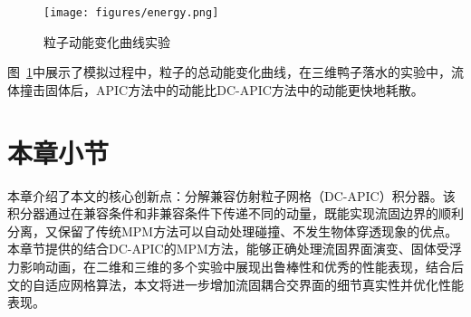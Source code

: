 \begin{figure}[H]
    \centering
    \texttt{[image: figures/energy.png]}
    \caption{粒子动能变化曲线实验}
    \label{fig:energy}
\end{figure}
图~\ref{fig:energy}中展示了模拟过程中，粒子的总动能变化曲线，在三维鸭子落水的实验中，流体撞击固体后，APIC方法中的动能比DC-APIC方法中的动能更快地耗散。


\section{本章小节}
本章介绍了本文的核心创新点：分解兼容仿射粒子网格（DC-APIC）积分器。该积分器通过在兼容条件和非兼容条件下传递不同的动量，既能实现流固边界的顺利分离，又保留了传统MPM方法可以自动处理碰撞、不发生物体穿透现象的优点。本章节提供的结合DC-APIC的MPM方法，能够正确处理流固界面演变、固体受浮力影响动画，在二维和三维的多个实验中展现出鲁棒性和优秀的性能表现，结合后文的自适应网格算法，本文将进一步增加流固耦合交界面的细节真实性并优化性能表现。